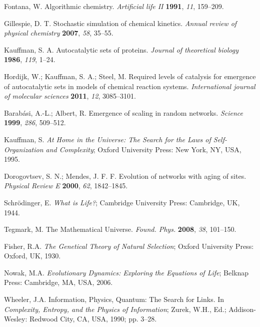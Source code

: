 \documentclass[preprint,12pt]{elsarticle}
\begin{document}
\begin{thebibliography}{999}

Fontana, W. Algorithmic chemistry. \textit{Artificial life II} \textbf{1991}, \textit{11}, 159–209.

Gillespie, D. T. Stochastic simulation of chemical kinetics. \textit{Annual review of physical chemistry} \textbf{2007}, \textit{58}, 35–55.

Kauffman, S. A. Autocatalytic sets of proteins. \textit{Journal of theoretical biology} \textbf{1986}, \textit{119}, 1–24.

Hordijk, W.; Kauffman, S. A.; Steel, M. Required levels of catalysis for emergence of autocatalytic sets in models of chemical reaction systems. \textit{International journal of molecular sciences} \textbf{2011}, \textit{12}, 3085–3101.

Barabási, A.-L.; Albert, R. Emergence of scaling in random networks. \textit{Science} \textbf{1999}, \textit{286}, 509–512.

Kauffman, S. \textit{At Home in the Universe: The Search for the Laws of Self-Organization and Complexity}; Oxford University Press: New York, NY, USA, 1995.

Dorogovtsev, S. N.; Mendes, J. F. F. Evolution of networks with aging of sites. \textit{Physical Review E} \textbf{2000}, \textit{62}, 1842–1845.

Schrödinger, E. \textit{What is Life?}; Cambridge University Press: Cambridge, UK, 1944.

Tegmark, M. The Mathematical Universe. \textit{Found. Phys.} \textbf{2008}, \textit{38}, 101–150. 

Fisher, R.A. \textit{The Genetical Theory of Natural Selection}; Oxford University Press: Oxford, UK, 1930.

Nowak, M.A. \textit{Evolutionary Dynamics: Exploring the Equations of Life}; Belknap Press: Cambridge, MA, USA, 2006.

Wheeler, J.A. Information, Physics, Quantum: The Search for Links. In \textit{Complexity, Entropy, and the Physics of Information}; Zurek, W.H., Ed.; Addison-Wesley: Redwood City, CA, USA, 1990; pp. 3–28.


\end{thebibliography}
\end{document}
